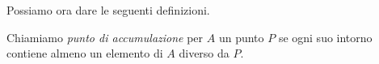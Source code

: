 % 
% 
% 
% 
% 

Possiamo ora dare le seguenti definizioni. 

\begin{newdef}{}{}
Chiamiamo \emph{punto di accumulazione} per \(A\) un punto \(P\) se ogni 
suo intorno contiene almeno un elemento di \(A\) diverso da \(P\).
\end{newdef}

